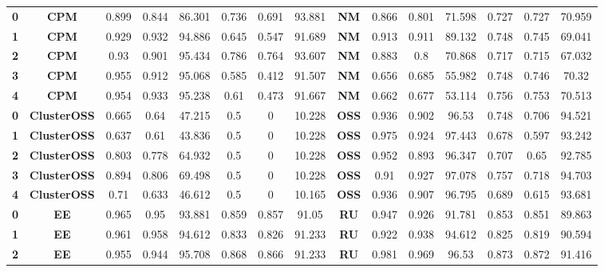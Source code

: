 {{\begin{tabular}{c|c|cccccc|ccccccc}
\textbf{0} & \textbf{CPM} & 0.899 & 0.844 & 86.301 & 0.736 & 0.691 & 93.881 & \multicolumn{1}{c|}{\textbf{NM}} & 0.866 & 0.801 & 71.598 & 0.727 & 0.727 & 70.959 \\
\textbf{1} & \textbf{CPM} & 0.929 & 0.932 & 94.886 & 0.645 & 0.547 & 91.689 & \multicolumn{1}{c|}{\textbf{NM}} & 0.913 & 0.911 & 89.132 & 0.748 & 0.745 & 69.041 \\
\textbf{2} & \textbf{CPM} & 0.93  & 0.901 & 95.434 & 0.786 & 0.764 & 93.607 & \multicolumn{1}{c|}{\textbf{NM}} & 0.883 & 0.8   & 70.868 & 0.717 & 0.715 & 67.032 \\
\textbf{3} & \textbf{CPM} & 0.955 & 0.912 & 95.068 & 0.585 & 0.412 & 91.507 & \multicolumn{1}{c|}{\textbf{NM}} & 0.656 & 0.685 & 55.982 & 0.748 & 0.746 & 70.32 \\
\textbf{4} & \textbf{CPM} & 0.954 & 0.933 & 95.238 & 0.61  & 0.473 & 91.667 & \multicolumn{1}{c|}{\textbf{NM}} & 0.662 & 0.677 & 53.114 & 0.756 & 0.753 & 70.513 \\
\textbf{0} & \textbf{ClusterOSS} & 0.665 & 0.64  & 47.215 & 0.5   & 0     & 10.228 & \multicolumn{1}{c|}{\textbf{OSS}} & 0.936 & 0.902 & 96.53 & 0.748 & 0.706 & 94.521 \\
\textbf{1} & \textbf{ClusterOSS} & 0.637 & 0.61  & 43.836 & 0.5   & 0     & 10.228 & \multicolumn{1}{c|}{\textbf{OSS}} & 0.975 & 0.924 & 97.443 & 0.678 & 0.597 & 93.242 \\
\textbf{2} & \textbf{ClusterOSS} & 0.803 & 0.778 & 64.932 & 0.5   & 0     & 10.228 & \multicolumn{1}{c|}{\textbf{OSS}} & 0.952 & 0.893 & 96.347 & 0.707 & 0.65  & 92.785 \\
\textbf{3} & \textbf{ClusterOSS} & 0.894 & 0.806 & 69.498 & 0.5   & 0     & 10.228 & \multicolumn{1}{c|}{\textbf{OSS}} & 0.91  & 0.927 & 97.078 & 0.757 & 0.718 & 94.703 \\
\textbf{4} & \textbf{ClusterOSS} & 0.71  & 0.633 & 46.612 & 0.5   & 0     & 10.165 & \multicolumn{1}{c|}{\textbf{OSS}} & 0.936 & 0.907 & 96.795 & 0.689 & 0.615 & 93.681 \\
\textbf{0} & \textbf{EE} & 0.965 & 0.95  & 93.881 & 0.859 & 0.857 & 91.05 & \multicolumn{1}{c|}{\textbf{RU}} & 0.947 & 0.926 & 91.781 & 0.853 & 0.851 & 89.863 \\
\textbf{1} & \textbf{EE} & 0.961 & 0.958 & 94.612 & 0.833 & 0.826 & 91.233 & \multicolumn{1}{c|}{\textbf{RU}} & 0.922 & 0.938 & 94.612 & 0.825 & 0.819 & 90.594 \\
\textbf{2} & \textbf{EE} & 0.955 & 0.944 & 95.708 & 0.868 & 0.866 & 91.233 & \multicolumn{1}{c|}{\textbf{RU}} & 0.981 & 0.969 & 96.53 & 0.873 & 0.872 & 91.416 \\

\end{tabular}}}
